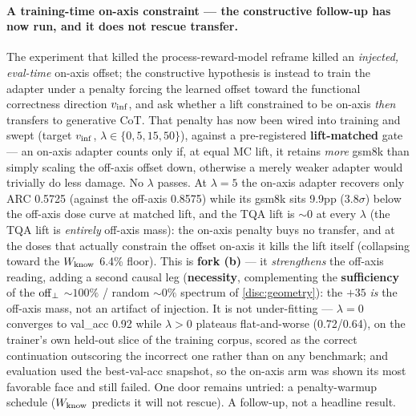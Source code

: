 \paragraph{A training-time on-axis constraint --- the constructive follow-up has
now run, and it does not rescue transfer.}
The experiment that killed the process-reward-model reframe killed an
\emph{injected, eval-time} on-axis offset; the constructive hypothesis is instead
to train the adapter under a penalty forcing the learned offset toward the
functional correctness direction $v_{\mathrm{inf}}$, and ask whether a lift constrained to be
on-axis \emph{then} transfers to generative CoT. That penalty has now been wired
into training and swept (target $v_{\mathrm{inf}}$, $\lambda \in \{0, 5, 15, 50\}$), against a
pre-registered \textbf{lift-matched} gate --- an on-axis adapter counts only if, at
equal MC lift, it retains \emph{more} gsm8k than simply scaling the off-axis offset
down, otherwise a merely weaker adapter would trivially do less damage. No
$\lambda$ passes. At $\lambda{=}5$ the on-axis adapter recovers only ARC 0.5725
(against the off-axis 0.8575) while its gsm8k sits 9.9pp ($3.8\sigma$) below the
off-axis dose curve at matched lift, and the TQA lift is ${\sim}0$ at every
$\lambda$ (the TQA lift is \emph{entirely} off-axis mass): the on-axis penalty buys
no transfer, and at the doses that actually constrain the offset on-axis it kills
the lift itself (collapsing toward the $W_{\mathrm{know}}$ 6.4\% floor). This is \textbf{fork
(b)} --- it \emph{strengthens} the off-axis reading, adding a second causal leg
(\textbf{necessity}, complementing the \textbf{sufficiency} of the $\mathrm{off}_{\perp}$
${\sim}100\%$ / random ${\sim}0\%$ spectrum of \cref{disc:geometry}): the $+35$
\emph{is} the off-axis mass, not an artifact of injection. It is not under-fitting
--- $\lambda{=}0$ converges to val\_acc 0.92 while $\lambda{>}0$ plateaus
flat-and-worse (0.72/0.64), on the trainer's own held-out slice of the training
corpus, scored as the correct continuation outscoring the incorrect one rather than
on any benchmark; and evaluation used the best-val-acc snapshot, so the
on-axis arm was shown its most favorable face and still failed. One door remains
untried: a penalty-warmup schedule ($W_{\mathrm{know}}$ predicts it will not rescue). A
follow-up, not a headline result.

